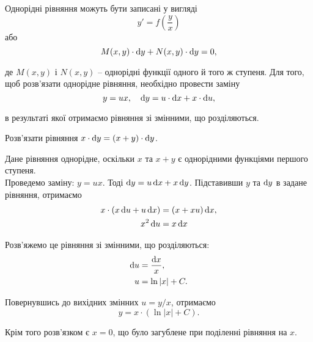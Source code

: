 Однорідні рівняння можуть бути записані у вигляді \[y' = f \left( \frac{y}{x} \right)\] або  \[ M(x, y)\cdot\mathop{}\!\mathrm{d} y + N(x, y) \cdot \mathop{}\!\mathrm{d} y = 0, \] 

де $M(x, y)$ і $N(x, y)$ -- однорідні функції одного й того ж ступеня. Для того, щоб розв'язати однорідне рівняння, необхідно провести заміну \[y = u x, \quad \mathop{}\!\mathrm{d} y = u \cdot \mathop{}\!\mathrm{d} x + x \cdot \mathop{}\!\mathrm{d} u,\] 

в результаті якої отримаємо рівняння зі змінними, що розділяються. 

\begin{example}
	Розв'язати рівняння $x \cdot \mathop{}\!\mathrm{d} y = (x + y) \cdot \mathop{}\!\mathrm{d} y$. 
\end{example}

\begin{solution}
	Дане рівняння однорідне, оскільки $x$ та $x + y$ є однорідними функціями першого ступеня. \\

	Проведемо заміну: $y = u x$. Тоді $\mathop{}\!\mathrm{d} y = u \mathop{}\!\mathrm{d} x + x \mathop{}\!\mathrm{d} y$. Підставивши $y$ та $\mathop{}\!\mathrm{d} y$ в задане рівняння, отримаємо  
	\begin{align*}
		x \cdot (x \mathop{}\!\mathrm{d} u + u \mathop{}\!\mathrm{d} x) &= (x + x u) \mathop{}\!\mathrm{d} x, \\
		x^2 \mathop{}\!\mathrm{d} u &= x \mathop{}\!\mathrm{d} x
	\end{align*}

	Розв'яжемо це рівняння зі змінними, що розділяються:
	\begin{align*}
		\mathop{}\!\mathrm{d} u &= \frac{\mathop{}\!\mathrm{d} x}{x}, \\
		u &= \ln |x| + C.
	\end{align*}

	Повернувшись до вихідних змінних $u = y / x$, отримаємо \[y = x \cdot (\ln |x| + C).\] 

	Крім того розв'язком є $x = 0$, що було загублене при поділенні рівняння на $x$.
\end{solution}

